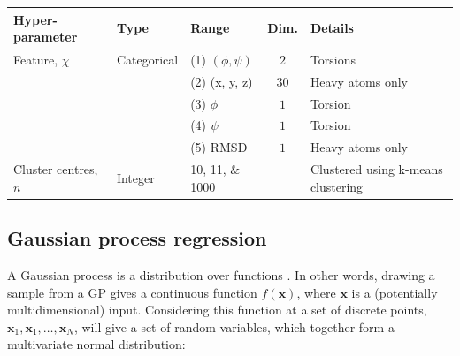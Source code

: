 \begin{table}
    \centering
    \begin{tabularx}{0.9\textwidth}{ |>{\raggedright\arraybackslash}X|l|l|c| >{\raggedright\arraybackslash}X | } 
    \hline
    \textbf{Hyper-parameter} & \textbf{Type} & \textbf{Range} &\textbf{Dim.} & \textbf{Details} \\
     \hline\hline
    Feature, $\chi$ & Categorical & (1) $(\phi, \psi)$ & $2$ & Torsions \\
    & & (2) (x, y, z) & $30$ & Heavy atoms only  \\
    & & (3) $\phi$ & $1$ & Torsion \\ 
    & & (4) $\psi$ & $1$ & Torsion \\ 
    & & (5) RMSD & $1$ & Heavy atoms only\\ 
    \hline 
    Cluster centres, $n$ & Integer & \numlist[list-final-separator = { ... }]{10;11;1000} & & Clustered using k-means clustering \\
     \hline
    \end{tabularx}
    \label{tab:ala2searchspace}
\end{table}

\subsection{Gaussian process regression}\label{subsec:gp}

A Gaussian process is a distribution over functions \cite{rasmussenGaussianProcessesMachine2006}.  In other words, drawing a sample from a GP gives a continuous function $f(\mathbf{x})$, where $\mathbf{x}$ is a (potentially multidimensional) input. Considering this function at a set of discrete points, $\mathbf{x}_{1}, \mathbf{x}_{1},\ldots, \mathbf{x}_{N}$, will give a set of random variables, which together form a multivariate normal distribution: 

